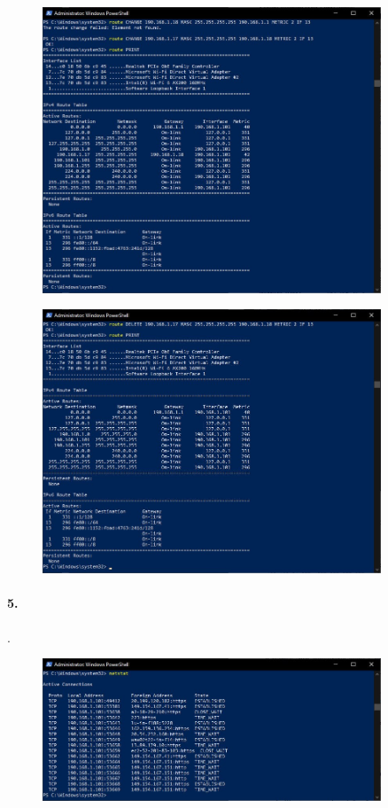 \documentclass[12pt]{extarticle}
\begin{document}
\begin{figure}[H]
    \centering
    \includegraphics[width=0.90\textwidth]{route_change}
    \caption{}
\end{figure}

\begin{figure}[H]
    \centering
    \includegraphics[width=0.90\textwidth]{route_delete}
    \caption{}
\end{figure}


\paragraph{5.}.

\begin{figure}[H]
    \centering
    \includegraphics[width=0.90\textwidth]{netstat}
    \caption{}
\end{figure}
\end{document}
